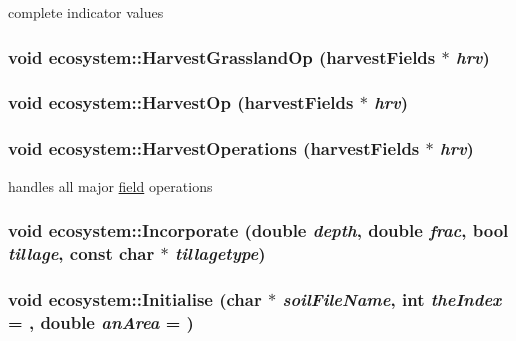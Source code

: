 complete indicator values \hypertarget{classecosystem_a4568fb9f9ba3632f8ae23cdab062059a}{
\subsubsection[{HarvestGrasslandOp}]{\setlength{\rightskip}{0pt plus 5cm}void ecosystem::HarvestGrasslandOp ({\bf harvestFields} $\ast$ {\em hrv})}}
\label{classecosystem_a4568fb9f9ba3632f8ae23cdab062059a}
\hypertarget{classecosystem_ae5431fb2c02834e47a7f8540b1ee6e15}{
\subsubsection[{HarvestOp}]{\setlength{\rightskip}{0pt plus 5cm}void ecosystem::HarvestOp ({\bf harvestFields} $\ast$ {\em hrv})}}
\label{classecosystem_ae5431fb2c02834e47a7f8540b1ee6e15}
\hypertarget{classecosystem_ae27dd7b646f92381708692d7b840a81e}{
\subsubsection[{HarvestOperations}]{\setlength{\rightskip}{0pt plus 5cm}void ecosystem::HarvestOperations ({\bf harvestFields} $\ast$ {\em hrv})}}
\label{classecosystem_ae27dd7b646f92381708692d7b840a81e}


handles all major \hyperlink{classfield}{field} operations \hypertarget{classecosystem_a5fb59e12490ad702d87765d64ce74ba2}{
\subsubsection[{Incorporate}]{\setlength{\rightskip}{0pt plus 5cm}void ecosystem::Incorporate (double {\em depth}, \/  double {\em frac}, \/  bool {\em tillage}, \/  const char $\ast$ {\em tillagetype})}}
\label{classecosystem_a5fb59e12490ad702d87765d64ce74ba2}
\hypertarget{classecosystem_aef0ef46a098200f4cf5b24b497508412}{
\subsubsection[{Initialise}]{\setlength{\rightskip}{0pt plus 5cm}void ecosystem::Initialise (char $\ast$ {\em soilFileName}, \/  int {\em theIndex} = {}, \/  double {\em anArea} = {})}}
\label{classecosystem_aef0ef46a098200f4cf5b24b497508412}


